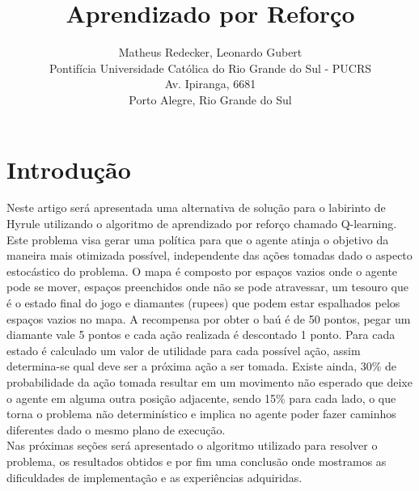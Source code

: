 \documentclass[letterpaper]{article}
\begin{document}
 \nocopyright
%
\title{ Aprendizado por Reforço  }
\author{Matheus Redecker, Leonardo Gubert\\
Pontifícia Universidade Católica do Rio Grande do Sul - PUCRS\\
Av. Ipiranga, 6681 \\
Porto Alegre, Rio Grande do Sul\\
}
\maketitle

\section{Introdução}
Neste artigo será apresentada uma alternativa de solução para o labirinto de Hyrule utilizando o algoritmo de aprendizado por reforço chamado Q-learning. Este problema visa gerar uma política para que o agente atinja o objetivo da maneira mais otimizada possível, independente das ações tomadas dado o aspecto estocástico do problema. O mapa é composto por espaços vazios onde o agente pode se mover, espaços preenchidos onde não se pode atravessar, um tesouro que é o estado final do jogo e diamantes (rupees) que podem estar espalhados pelos espaços vazios no mapa. A recompensa por obter o baú é de 50 pontos, pegar um diamante vale 5 pontos e cada ação realizada é descontado 1 ponto. Para cada estado é calculado um valor de utilidade para cada possível ação, assim determina-se qual deve ser a próxima ação a ser tomada. Existe ainda, 30\% de probabilidade da ação tomada resultar em um movimento não esperado que deixe o agente em alguma outra posição adjacente, sendo 15\% para cada lado, o que torna o problema não determinístico e implica no agente poder fazer caminhos diferentes dado o mesmo plano de execução. \\
Nas próximas seções será apresentado o algoritmo utilizado para resolver o problema, os resultados obtidos e por fim uma conclusão onde mostramos as dificuldades de implementação e as experiências adquiridas. 
\end{document}
